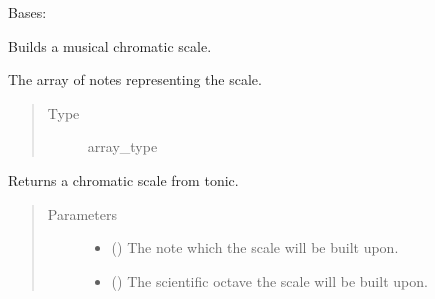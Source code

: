 \documentclass[letterpaper,10pt,english]{sphinxmanual}
\begin{document}
\begin{fulllineitems}
\label{\detokenize{index:birdears.scale.ChromaticScale}}
Bases: {\hyperref[\detokenize{index:birdears.scale.ScaleBase}]{}}

Builds a musical chromatic scale.

\begin{fulllineitems}
\label{\detokenize{index:birdears.scale.ChromaticScale.scale}}
The array of notes representing the scale.
\begin{quote}\begin{description}
\item[{Type}] \leavevmode
array\_type

\end{description}\end{quote}

\end{fulllineitems}


\begin{fulllineitems}
\label{\detokenize{index:birdears.scale.ChromaticScale.__init__}}
Returns a chromatic scale from tonic.
\begin{quote}\begin{description}
\item[{Parameters}] \leavevmode\begin{itemize}
\item {} 
 () \textendash{} The note which the scale will be built upon.

\item {} 
 () \textendash{} The scientific octave the scale will be built upon.


\end{itemize}
\end{description}
\end{quote}
\end{fulllineitems}
\end{fulllineitems}
\end{document}
